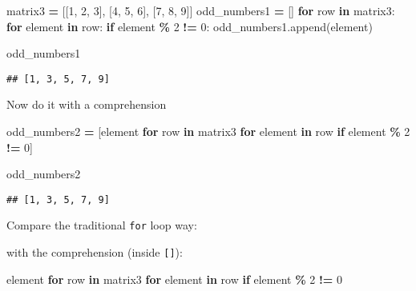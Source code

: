 \documentclass[
]{book}
\newenvironment{Shaded}{\begin{snugshade}}{\end{snugshade}}
\newcommand{\ControlFlowTok}[1]{\textcolor[rgb]{0.13,0.29,0.53}{\textbf{#1}}}
\newcommand{\DecValTok}[1]{\textcolor[rgb]{0.00,0.00,0.81}{#1}}
\newcommand{\KeywordTok}[1]{\textcolor[rgb]{0.13,0.29,0.53}{\textbf{#1}}}
\newcommand{\NormalTok}[1]{#1}
\newcommand{\OperatorTok}[1]{\textcolor[rgb]{0.81,0.36,0.00}{\textbf{#1}}}
\begin{document}
\begin{Shaded}
\begin{Highlighting}[]
\NormalTok{matrix3 }\OperatorTok{=}\NormalTok{ [[}\DecValTok{1}\NormalTok{, }\DecValTok{2}\NormalTok{, }\DecValTok{3}\NormalTok{], [}\DecValTok{4}\NormalTok{, }\DecValTok{5}\NormalTok{, }\DecValTok{6}\NormalTok{], [}\DecValTok{7}\NormalTok{, }\DecValTok{8}\NormalTok{, }\DecValTok{9}\NormalTok{]]}
\NormalTok{odd\_numbers1 }\OperatorTok{=}\NormalTok{ []}
\ControlFlowTok{for}\NormalTok{ row }\KeywordTok{in}\NormalTok{ matrix3:}
    \ControlFlowTok{for}\NormalTok{ element }\KeywordTok{in}\NormalTok{ row:}
        \ControlFlowTok{if}\NormalTok{ element }\OperatorTok{\%} \DecValTok{2} \OperatorTok{!=} \DecValTok{0}\NormalTok{:}
\NormalTok{            odd\_numbers1.append(element)}

\NormalTok{odd\_numbers1}
\end{Highlighting}
\end{Shaded}

\begin{verbatim}
## [1, 3, 5, 7, 9]
\end{verbatim}

Now do it with a comprehension

\begin{Shaded}
\begin{Highlighting}[]
\NormalTok{odd\_numbers2 }\OperatorTok{=}\NormalTok{ [element }\ControlFlowTok{for}\NormalTok{ row }\KeywordTok{in}\NormalTok{ matrix3 }\ControlFlowTok{for}\NormalTok{ element }\KeywordTok{in}\NormalTok{ row }\ControlFlowTok{if}\NormalTok{ element }\OperatorTok{\%} \DecValTok{2} \OperatorTok{!=} \DecValTok{0}\NormalTok{]}

\NormalTok{odd\_numbers2}
\end{Highlighting}
\end{Shaded}

\begin{verbatim}
## [1, 3, 5, 7, 9]
\end{verbatim}

Compare the traditional \texttt{for} loop way:

with the comprehension (inside \texttt{{[}{]}}):

\begin{Shaded}
\begin{Highlighting}[]
\NormalTok{element                        }
    \ControlFlowTok{for}\NormalTok{ row }\KeywordTok{in}\NormalTok{ matrix3 }
        \ControlFlowTok{for}\NormalTok{ element }\KeywordTok{in}\NormalTok{ row }
            \ControlFlowTok{if}\NormalTok{ element }\OperatorTok{\%} \DecValTok{2} \OperatorTok{!=} \DecValTok{0}
\end{Highlighting}
\end{Shaded}
\end{document}

